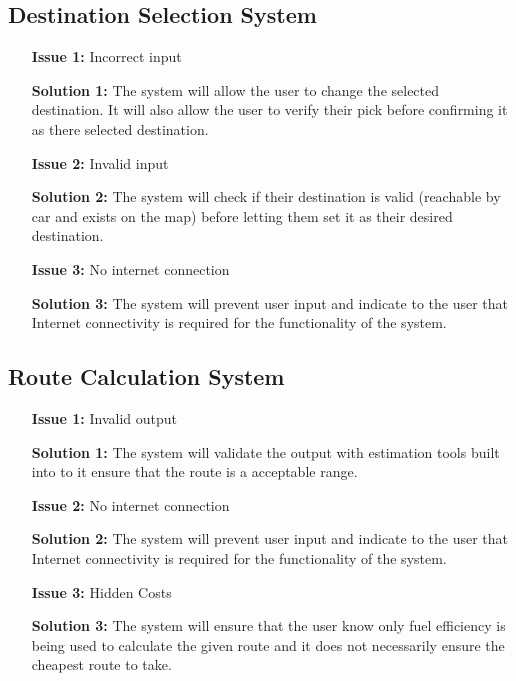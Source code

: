 \documentclass{article}
\begin{document}
\subsection{Destination Selection System}
\begin{itemize}
	\item[\textbf{Issue 1:}] Incorrect input
	\item[\textbf{Solution 1:}] The system will allow the user to change the selected destination. It will also allow the user to verify their pick 
	before confirming it as there selected destination.
	\item[\textbf{Issue 2:}] Invalid input
	\item[\textbf{Solution 2:}] The system will check if their destination is valid (reachable by car and exists on the map) before letting them set it as their desired destination.
	\item[\textbf{Issue 3:}] No internet connection
	\item[\textbf{Solution 3:}] The system will prevent user input and indicate to the user that Internet connectivity is required for the functionality of the system.
\end{itemize}

\subsection{Route Calculation System}
\begin{itemize}
	\item[\textbf{Issue 1:}] Invalid output
	\item[\textbf{Solution 1:}] The system will validate the output with estimation tools built into to it ensure that the route is a acceptable range.
	\item[\textbf{Issue 2:}] No internet connection
	\item[\textbf{Solution 2:}] The system will prevent user input and indicate to the user that Internet connectivity is required for the functionality of the system.
	\item[\textbf{Issue 3:}] Hidden Costs
	\item[\textbf{Solution 3:}] The system will ensure that the user know only fuel efficiency is being used to calculate the given route and it does 
	not necessarily ensure the cheapest route to take.
\end{itemize}
\end{document}
